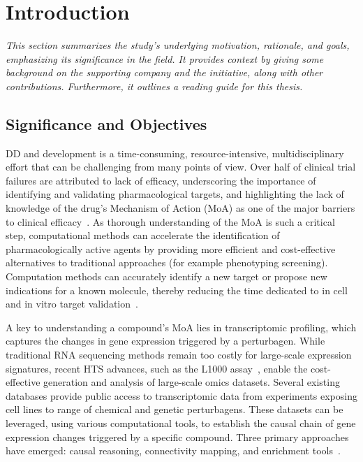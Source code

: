 
%

\makeatletter
\newcommand{\ntifpkgloaded}{%
  \@ifpackageloaded%
}
\makeatother

\chapter{Introduction}
\label{cha:introduction}

\textit{This section summarizes the study's underlying motivation, rationale, and goals, emphasizing its significance in the field. It provides context by giving some background on the supporting company and the initiative, along with other contributions. Furthermore, it outlines a reading guide for this thesis.}

\section{Significance and Objectives} %
\label{sec:significance_and_objectives}


\gls{DD} and development is a time-consuming, resource-intensive, multidisciplinary effort that can be challenging from many points of view. 
Over half of clinical trial failures are attributed to lack of efficacy, underscoring the importance of identifying and validating pharmacological targets, and highlighting the lack of knowledge of the drug's \gls{Mechanism of Action (MoA)} as one of the major barriers to clinical efficacy~\cite{RN3, RN1, RN2}. 
As thorough understanding of the \gls{MoA} is such a critical step, computational methods can accelerate the identification of pharmacologically active agents by providing more efficient and cost-effective alternatives to traditional approaches (for example phenotyping screening). 
Computation methods can accurately identify a new target or propose new indications for a known molecule, thereby reducing the time dedicated to in cell and in vitro target validation~\cite{RN29}.

A key to understanding a compound's \gls{MoA} lies in transcriptomic profiling, which captures the changes in gene expression triggered by a perturbagen. 
While traditional RNA sequencing methods remain too costly for large-scale expression signatures, recent \gls{HTS} advances, such as the L1000 assay~\cite{RN30}, enable the cost-effective generation and analysis of large-scale omics datasets. 
Several existing databases provide public access to transcriptomic data from experiments exposing cell lines to range of chemical and genetic perturbagens. 
These datasets can be leveraged, using various computational tools, to establish the causal chain of gene expression changes triggered by a specific compound. 
Three primary approaches have emerged: causal reasoning, connectivity mapping, and enrichment tools~\cite{RN31}.


